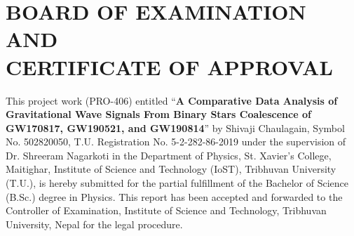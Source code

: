 \chapter*{BOARD OF EXAMINATION AND \\ CERTIFICATE OF APPROVAL}
This project work (PRO-406) entitled ``\textbf{A Comparative Data Analysis of Gravitational Wave Signals From Binary Stars Coalescence of GW170817, GW190521, and GW190814}” by Shivaji Chaulagain, Symbol No. 502820050, T.U. Registration No. 5-2-282-86-2019 under the supervision of Dr. Shreeram Nagarkoti in the Department of Physics, St. Xavier's College, Maitighar, Institute of Science and Technology (IoST), Tribhuvan University (T.U.), is hereby submitted for the partial fulfillment of the Bachelor of Science (B.Sc.) degree in Physics. This report has been accepted and forwarded to the Controller of Examination, Institute of Science and Technology, Tribhuvan University, Nepal for the legal procedure.

